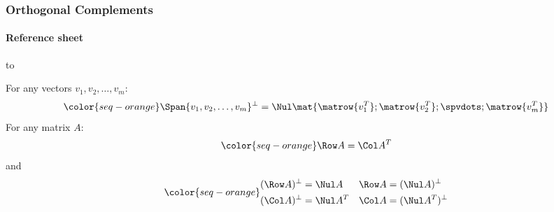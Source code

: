 
\begin{frame}
\frametitle{Orthogonal Complements}
\framesubtitle{Reference sheet}

\hbox to 

\bigskip\centering
For any vectors $v_1,v_2,\ldots,v_m$:
\[\color{seq-orange} \Span\{v_1,v_2,\ldots,v_m\}^\perp = \Nul\mat{
  \matrow{v_1^T};
  \matrow{v_2^T};
  \spvdots;
  \matrow{v_m^T}} \]
\medskip
For any matrix $A$:
\[\color{seq-orange} \Row A = \Col A^T \]
\medskip
and
\[\color{seq-orange}
\begin{aligned}
  (\Row A)^\perp &= \Nul A    &  \Row A &= (\Nul A)^\perp \\
  (\Col A)^\perp &= \Nul A^T  &  \Col A &= (\Nul A^T)^\perp
\end{aligned}\]

\end{frame}




